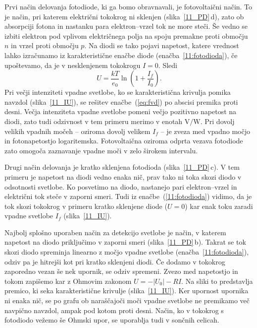 Prvi način delovanja fotodiode, ki ga bomo obravnavali, je fotovoltaični način.
To je način, pri katerem električni tokokrog ni sklenjen (slika~\ref{11_PD}\,d), 
zato ob absorpciji fotona in nastanku para elektron--vrzel tok ne more steči. 
Še vedno se izbiti elektron pod vplivom električnega polja
na spoju premakne proti območju $n$ in vrzel proti območju $p$.
Na diodi se tako pojavi napetost, 
katere vrednost lahko izračunamo iz karakteristične enačbe diode (enačba~\ref{11:fotodioda}), 
če upoštevamo, da je v nesklenjenem tokokrogu $I=0$. Sledi
\begin{equation}
U = \frac{kT}{e_0}\ln \left(1+ \frac{I_f}{I_0}\right).
\label{eq:fvd}
\end{equation}
Pri večji intenziteti vpadne svetlobe, ko se karakteristična krivulja 
pomika navzdol (slika~\ref{11_IU}), se rešitev enačbe~(\ref{eq:fvd}) po abscisi premika proti desni.
Večja intenziteta vpadne svetlobe pomeni večjo 
pozitivno napetost na diodi, zato tudi odzivnost v tem primeru merimo v enotah $\si{\volt}/\si{\watt}$.
Pri dovolj velikih vpadnih močeh -- oziroma dovolj velikem $I_f$ -- je
zveza med vpadno močjo in fotonapetostjo
logaritemska. Fotovoltaična oziroma odprta vezava fotodiode zato omogoča 
zaznavanje vpadne moči v zelo širokem intervalu. 

Drugi način delovanja je kratko sklenjena fotodioda (slika~\ref{11_PD}\,c).
V tem primeru je  napetost na diodi 
vedno enaka nič, prav tako ni toka skozi diodo v odsotnosti svetlobe. 
Ko posvetimo na diodo, nastanejo pari elektron--vrzel in električni tok steče
v zaporni smeri. Tudi iz enačbe~(\ref{11:fotodioda}) vidimo, da je tok 
skozi tokokrog v primeru kratko sklenjene diode ($U=0$) kar enak toku 
zaradi vpadne svetlobe $I_f$ (slika~\ref{11_IU}). 

Najbolj splošno uporaben način za detekcijo svetlobe je način, v katerem 
napetost na diodo priključimo v zaporni smeri (slika~\ref{11_PD}\,b).
Takrat se tok skozi diodo spreminja linearno z močjo vpadne svetlobe
(enačba~\ref{11:fotodioda}), odziv pa je hitrejši
kot pri kratko sklenjeni diodi. Če dodamo v tokokrog zaporedno vezan še nek upornik, se odziv
spremeni. Zvezo med napetostjo in tokom zapišemo kar z Ohmovim zakonom $U = -|U_0|-RI$. 
Na sliki to predstavlja premico, ki seka karakteristične krivulje (slika~\ref{11_IU}). Ker upornost
upornika ni enaka nič, se po grafu ob naraščajoči moči vpadne svetlobe ne premikamo več navpično navzdol, 
ampak pod kotom proti desni. Način, ko v tokokrog s fotodiodo vežemo še Ohmski upor,
se uporablja tudi v sončnih celicah. 

